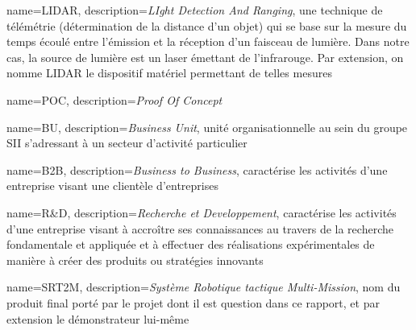 \makeglossaries

{
	name={LIDAR},
	description={\emph{LIght Detection And Ranging}, une technique de télémétrie (détermination de la distance d'un objet) qui se base sur la mesure du temps écoulé entre l'émission et la réception d'un faisceau de lumière. Dans notre cas, la source de lumière est un laser émettant de l'infrarouge. Par extension, on nomme LIDAR le dispositif matériel permettant de telles mesures}
}

{
	name={POC},
	description={\emph{Proof Of Concept}}
}

{
	name={BU},
	description={\emph{Business Unit}, unité organisationnelle au sein du groupe SII s'adressant à un secteur d'activité particulier}
}

{
	name={B2B},
	description={\emph{Business to Business}, caractérise les activités d'une entreprise visant une clientèle d'entreprises}
}

{
	name={R\&D},
	description={\emph{Recherche et Developpement}, caractérise les activités d'une entreprise visant à accroître ses connaissances au travers de la recherche fondamentale et appliquée et à effectuer des réalisations expérimentales de manière à créer des produits ou stratégies innovants}
}

{
	name={SRT2M},
	description={\emph{Système Robotique tactique Multi-Mission}, nom du produit final porté par le projet dont il est question dans ce rapport, et par extension le démonstrateur lui-même}
}
